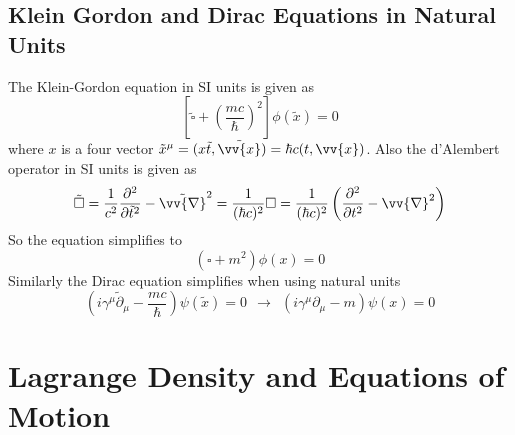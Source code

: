 \documentclass{include/thesisclass}
\newcommand{\vx}{\vv{x}}
\newcommand{\df}{\rightarrow}
\newcommand{\p}{\partial}
\newcommand{\vn}{\vv{\nabla}}
\begin{document}
\subsection{Klein Gordon and Dirac Equations in Natural Units}
The Klein-Gordon equation in SI units is given as
\[
\left[ \tilde{\square} + \left( \frac{mc}{\hbar}\right)^2 \right] \phi(\tilde{x}) = 0
\]
where $x$ is a four vector $\tilde{x}^\mu = ( x \tilde{t}, \tilde{\vx}) = \hbar c (t , \vx)$. Also the d'Alembert operator in SI units is given as
\[ 
\tilde{\square} = \frac{1}{c^2} \frac{\p^2}{\p \tilde{t}^2} - \tilde{\vn}^2 = \frac{1}{(\hbar c)^2} \square = \frac{1}{(\hbar c)^2} \left( \frac{\p^2}{\p t^2} - \vn^2 \right)
\]
So the equation simplifies to 
\[ ( \square + m^2 ) \phi(x) = 0\]
\newline
Similarly the Dirac equation simplifies when using natural units
\[
\left( i \gamma^\mu \tilde{\p}_\mu - \frac{m c}{\hbar}\right) \psi(\tilde{x}) = 0 ~~\df~~ (i \gamma^\mu \p_\mu - m ) \psi(x) = 0
\]

\section{Lagrange Density and Equations of Motion}
\end{document}
